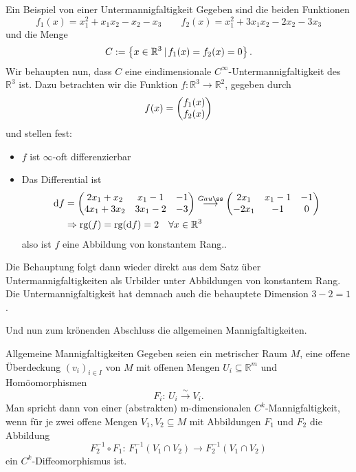 \begin{Beispiel}
    {Ein Beispiel von einer Untermannigfaltigkeit}
    Gegeben sind die beiden Funktionen
    \begin{equation*}
        f_1(x)=x_1^2+x_1x_2-x_2-x_3 \qquad f_2(x)=x_1^2+3x_1x_2-2x_2-3x_3
    \end{equation*}
    und die Menge
    \begin{equation*}
        C:=\left\{x\in\mathbb{R}^3\,|\, f_1(x)=f_2(x)=0\right\}.
    \end{equation*}
    Wir behaupten nun, dass $C$ eine eindimensionale $C^{\infty}$-Untermannigfaltigkeit des $\mathbb{R}^3$ ist. Dazu betrachten wir die Funktion $f:\mathbb{R}^3\rightarrow\mathbb{R}^2$, gegeben durch
    \begin{equation*}
        f(x)=\begin{pmatrix}f_1(x) \\ f_2(x)\end{pmatrix}
    \end{equation*}
    und stellen fest:
    \begin{itemize}
        \item $f$ ist $\infty$-oft differenzierbar
        \item Das Differential ist
        \begin{align*}
            \text{d}f&=\Matrix{2x_1+x_2 & x_1-1 & -1 \\ 4x_1+3x_2 & 3x_1-2 & -3} \overset{Gauß}{\longrightarrow} \Matrix{2x_1 & x_1-1 & -1 \\ -2x_1 & -1 & 0} \\
            &\Rightarrow \text{rg}(f)=\text{rg}(\text{d}f)=2 \quad \forall x\in\mathbb{R}^3
        \end{align*}
        also ist $f$ eine Abbildung von konstantem Rang..
    \end{itemize}
    Die Behauptung folgt dann wieder direkt aus dem Satz über Untermannigfaltigkeiten als Urbilder unter Abbildungen von konstantem Rang. Die Untermannigfaltigkeit hat demnach auch die behauptete Dimension $3-2=1$.
\end{Beispiel}

Und nun zum krönenden Abschluss die allgemeinen Mannigfaltigkeiten.
\begin{Def}
    {Allgemeine Mannigfaltigkeiten}
    Gegeben seien ein metrischer Raum $M$, eine offene Überdeckung $(v_i)_{i\in I}$ von $M$ mit offenen Mengen $U_i \subseteq \mathbb{R}^m$ und Homöomorphismen 
    \begin{equation*}
        F_i:\, U_i\overset{\sim}{\rightarrow} V_i.
    \end{equation*}
    Man spricht dann von einer (abstrakten) m-dimensionalen $C^k$-Mannigfaltigkeit, wenn für je zwei offene Mengen $V_1,V_2\subseteq M$ mit Abbildungen $F_1$ und $F_2$ die Abbildung
    \begin{equation*}
        F_2^{-1}\circ F_1:\, F_1^{-1}(V_1\cap V_2) \rightarrow F_2^{-1}(V_1\cap V_2)
    \end{equation*}
    ein $C^k$-Diffeomorphismus ist.
\end{Def}